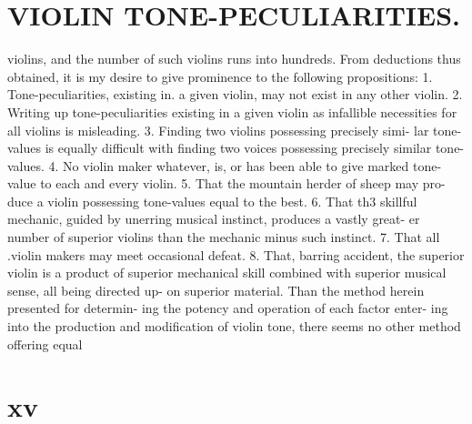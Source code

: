 \documentclass{article}
\begin{document}
\section*{VIOLIN TONE-PECULIARITIES.}
violins, and the number of such violins runs into hundreds. From deductions thus obtained, it is my desire to give prominence to the following propositions: 1. Tone-peculiarities, existing in. a given violin, may not exist in any other violin. 2. Writing up tone-peculiarities existing in a given violin as infallible necessities for all violins is misleading. 3. Finding two violins possessing precisely simi- lar tone- values is equally difficult with finding two voices possessing precisely similar tone- values. 4. No violin maker whatever, is, or has been able to give marked tone- value to each and every violin. 5. That the mountain herder of sheep may pro- duce a violin possessing tone-values equal to the best. 6. That th3 skillful mechanic, guided by unerring musical instinct, produces a vastly great- er number of superior violins than the mechanic minus such instinct. 7. That all .violin makers may meet occasional defeat. 8. That, barring accident, the superior violin is a product of superior mechanical skill combined with superior musical sense, all being directed up- on superior material. Than the method herein presented for determin- ing the potency and operation of each factor enter- ing into the production and modification of violin tone, there seems no other method offering equal

\section*{xv}
\end{document}

